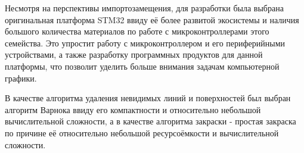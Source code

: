 Несмотря на перспективы импортозамещения, для разработки была выбрана оригинальная платформа STM32 ввиду её более развитой экосистемы и наличия большого количества материалов по работе с микроконтроллерами этого семейства. Это упростит работу с микроконтроллером и его периферийными устройствами, а также разработку программных продуктов для данной платформы, что позволит уделить больше внимания задачам компьютерной графики.

В качестве алгоритма удаления невидимых линий и поверхностей был выбран алгоритм Варнока ввиду его компактности и относительно небольшой вычислительной сложности, а в качестве алгоритма закраски -  простая закраска по причине её относительно небольшой ресурсоёмкости и вычислительной сложности.





